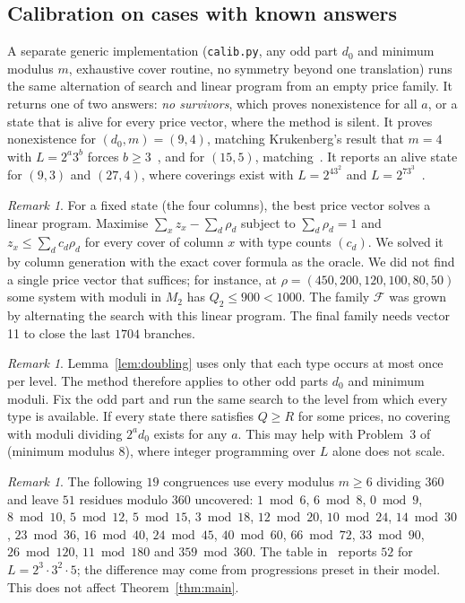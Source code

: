 \documentclass[11pt]{amsart}
\theoremstyle{definition}
\theoremstyle{remark}
\newtheorem{remark}[theorem]{Remark}
\begin{document}
\subsection*{Calibration on cases with known answers} A separate generic implementation (\texttt{calib.py}, any odd part $d_0$ and minimum modulus $m$, exhaustive cover routine, no symmetry beyond one translation) runs the same alternation of search and linear program from an empty price family. It returns one of two answers: \emph{no survivors}, which proves nonexistence for all $a$, or a state that is alive for every price vector, where the method is silent. It proves nonexistence for $(d_0,m)=(9,4)$, matching Krukenberg's result that $m=4$ with $L=2^a3^b$ forces $b\ge3$~\cite{Krukenberg1971,DaltonTrifonov2022}, and for $(15,5)$, matching~\cite[Lemma~5.1]{HKLT2026}. It reports an alive state for $(9,3)$ and $(27,4)$, where coverings exist with $L=2^43^2$ and $L=2^73^3$~\cite{DaltonTrifonov2022}.

\begin{remark}\label{rem:lp}
For a fixed state (the four columns), the best price vector solves a linear program. Maximise $\sum_x z_x-\sum_d\rho_d$ subject to $\sum_d\rho_d=1$ and $z_x\le\sum_d c_d\rho_d$ for every cover of column $x$ with type counts $(c_d)$. We solved it by column generation with the exact cover formula as the oracle. We did not find a single price vector that suffices; for instance, at $\rho=(450,200,120,100,80,50)$ some system with moduli in $M_2$ has $Q_2\le 900<1000$. The family $\mathcal F$ was grown by alternating the search with this linear program. The final family needs vector 11 to close the last $1704$ branches.
\end{remark}

\begin{remark}
Lemma~\ref{lem:doubling} uses only that each type occurs at most once per level. The method therefore applies to other odd parts $d_0$ and minimum moduli. Fix the odd part and run the same search to the level from which every type is available. If every state there satisfies $Q\ge R$ for some prices, no covering with moduli dividing $2^a d_0$ exists for any $a$. This may help with Problem~3 of~\cite{HKLT2026} (minimum modulus $8$), where integer programming over $L$ alone does not scale.
\end{remark}

\begin{remark}
The following $19$ congruences use every modulus $m\ge6$ dividing $360$ and leave $51$ residues modulo $360$ uncovered: $1\bmod6$, $6\bmod8$, $0\bmod9$, $8\bmod10$, $5\bmod12$, $5\bmod15$, $3\bmod18$, $12\bmod20$, $10\bmod24$, $14\bmod30$, $23\bmod36$, $16\bmod40$, $24\bmod45$, $40\bmod60$, $66\bmod72$, $33\bmod90$, $26\bmod120$, $11\bmod180$ and $359\bmod360$. The table in~\cite[Section~6]{HKLT2026} reports $52$ for $L=2^3\cdot3^2\cdot5$; the difference may come from progressions preset in their model. This does not affect Theorem~\ref{thm:main}.
\end{remark}
\end{document}
